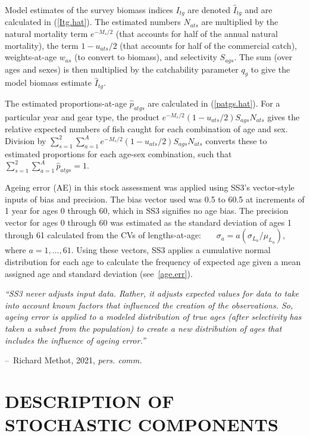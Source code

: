 \documentclass[11pt]{book}
\makeatletter
\newenvironment{chapquote}[2][2em]
  {\setlength{\@tempdima}{#1}%
   \def\chapquote@author{#2}%
   \parshape 1 \@tempdima \dimexpr\textwidth-2\@tempdima\relax%
   \itshape}
  {\par\normalfont\hfill--\ \chapquote@author\hspace*{\@tempdima}\par\smallskip}
\newcommand{\eref}[1]{(\ref{#1})}
\makeatother
\begin{document}
Model estimates of the survey biomass indices $I_{tg}$ are denoted $\widehat{I}_{tg}$ and are calculated in \eref{Itg.hat}.
The estimated numbers $N_{ats}$ are multiplied by the natural mortality term $e^{-M_s / 2}$ (that accounts for half of the annual natural mortality), the term $1 - u_{ats} / 2$ (that accounts for half of the commercial catch),  weights-at-age $w_{as}$ (to convert to biomass), and selectivity $S_{ags}$. 
The sum (over ages and sexes) is then multiplied by the catchability parameter $q_g$ to give the model biomass estimate $\widehat{I}_{tg}$. 

The estimated proportions-at-age $\widehat{p}_{atgs}$ are calculated in \eref{patgs.hat}. 
For a particular year and gear type, the product $e^{-M_{s}/2} (1 - u_{ats}/2) S_{ags} N_{ats}$ gives the relative expected numbers of fish caught for each combination of age and sex. 
Division by $\sum_{s=1}^2 \sum_{a=1}^A e^{-M_{s}/2} (1 - u_{ats}/2) S_{ags} N_{ats}$ converts these to estimated proportions for each age-sex combination, such that $\sum_{s=1}^2 \sum_{a=1}^{A} \widehat{p}_{atgs} = 1$.

Ageing error (AE) in this stock assessment was applied using SS3's vector-style inputs of bias and precision.
The bias vector used was 0.5 to 60.5 at increments of 1 year for ages 0 through 60, which in SS3 signifies no age bias.
The precision vector for ages 0 through 60 was estimated as the standard deviation of ages 1 through 61 calculated from the CVs of lengths-at-age:
~~~$\sigma_a = a (\sigma_{L_a} / \mu_{L_a})$, where $a=1,...,61$.
Using these vectors, SS3 applies a cumulative normal distribution for each age to calculate the frequency of expected age given a mean assigned age and standard deviation (see~\ref{age.err}).

\begin{chapquote}{Richard Methot, 2021, \textit{pers. comm.}}
``SS3 never adjusts input data.  Rather, it adjusts expected values for data to take into account known factors that influenced the creation of the observations. So, ageing error is applied to a modeled distribution of true ages (after selectivity has taken a subset from the population) to create a new distribution of ages that includes the influence of ageing error.''
\end{chapquote}

\section{DESCRIPTION OF STOCHASTIC COMPONENTS}
\end{document}
